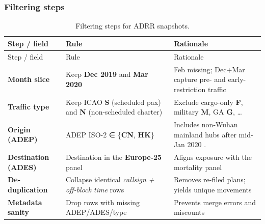 \documentclass[
  authoryear,
  preprint,
  3p,
  onecolumn]{elsarticle}
\begin{document}
\clearpage

\subsubsection{Filtering steps}\label{filtering-steps}

\begin{longtable}[]{@{}
  >{\raggedright\arraybackslash}p{}
  >{\raggedright\arraybackslash}p{}
  >{\raggedright\arraybackslash}p{}@{}}
\caption{Filtering steps for ADRR
snapshots.}\label{tbl-filtering}\tabularnewline
\toprule\noalign{}
\begin{minipage}[b]{\linewidth}\raggedright
Step / field
\end{minipage} & \begin{minipage}[b]{\linewidth}\raggedright
Rule
\end{minipage} & \begin{minipage}[b]{\linewidth}\raggedright
Rationale
\end{minipage} \\
\midrule\noalign{}
\endfirsthead
\toprule\noalign{}
\begin{minipage}[b]{\linewidth}\raggedright
Step / field
\end{minipage} & \begin{minipage}[b]{\linewidth}\raggedright
Rule
\end{minipage} & \begin{minipage}[b]{\linewidth}\raggedright
Rationale
\end{minipage} \\
\midrule\noalign{}
\endhead
\bottomrule\noalign{}
\endlastfoot
\textbf{Month slice} & Keep \textbf{Dec 2019} and \textbf{Mar 2020} &
Feb missing; Dec+Mar capture pre- and early-restriction traffic \\
\textbf{Traffic type} & Keep ICAO \textbf{S} (scheduled pax) and
\textbf{N} (non-scheduled charter) & Exclude cargo-only \textbf{F},
military \textbf{M}, GA \textbf{G}, \ldots{}
\citep{eurocontrol2025meta} \\
\textbf{Origin (ADEP)} & ADEP ISO-2 ∈ \{\textbf{CN}, \textbf{HK}\} &
Includes non-Wuhan mainland hubs after mid-Jan 2020
\citep{chinazzi2020}. \\
\textbf{Destination (ADES)} & Destination in the \textbf{Europe-25}
panel & Aligns exposure with the mortality panel \\
\textbf{De-duplication} & Collapse identical \emph{callsign + off-block
time} rows & Removes re-filed plans; yields unique movements \\
\textbf{Metadata sanity} & Drop rows with missing ADEP/ADES/type &
Prevents merge errors and miscounts \\
\end{longtable}
\end{document}

